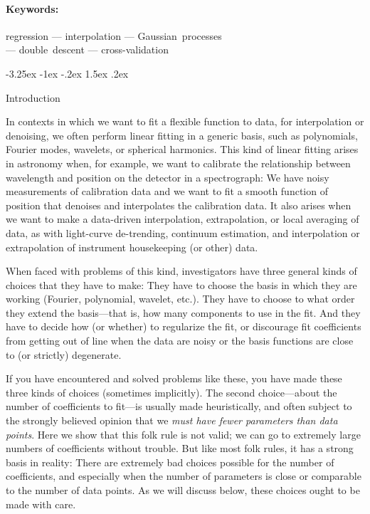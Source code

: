 \documentclass[12pt,letterpaper]{article}
\makeatletter
\renewcommand\section{\@startsection {section}{1}{\z@}%
  {-3.25ex \@plus -1ex \@minus -.2ex}%
  {1.5ex \@plus .2ex}%
  {\raggedright\normalfont\large\bfseries}}
\makeatother
\begin{document}
\paragraph{Keywords:}
regression
---
interpolation
---
Gaussian~processes
\\ ---
double~descent
---
cross-validation

\clearpage
\section{Introduction}

In contexts in which we want to fit a flexible function to data, for interpolation or denoising, we often perform linear fitting in a generic basis, such as polynomials, Fourier modes, wavelets, or spherical harmonics.
This kind of linear fitting arises in astronomy when, for example, we want to calibrate the relationship between wavelength and position on the detector in a spectrograph:
We have noisy measurements of calibration data and we want to fit a smooth function of position that denoises and interpolates the calibration data.
It also arises when we want to make a data-driven interpolation, extrapolation, or local averaging of data, as with light-curve de-trending, continuum estimation, and interpolation or extrapolation of instrument housekeeping (or other) data.

When faced with problems of this kind, investigators have three general kinds of choices that they have to make:
They have to choose the basis in which they are working (Fourier, polynomial, wavelet, etc.).
They have to choose to what order they extend the basis---that is, how many components to use in the fit.
And they have to decide how (or whether) to regularize the fit, or discourage fit coefficients from getting out of line when the data are noisy or the basis functions are close to (or strictly) degenerate.

If you have encountered and solved problems like these, you have made these three kinds of choices (sometimes implicitly).
The second choice---about the number of coefficients to fit---is usually made heuristically, and often subject to the strongly believed opinion that we \emph{must have fewer parameters than data points}.
Here we show that this folk rule is not valid; we can go to extremely large numbers of coefficients without trouble.
But like most folk rules, it has a strong basis in reality: There are extremely bad choices possible for the number of coefficients, and especially when the number of parameters is close or comparable to the number of data points.
As we will discuss below, these choices ought to be made with care.
\end{document}

